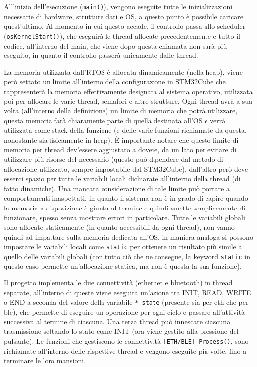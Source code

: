 All'inizio dell'esecuzione (\texttt{main()}), vengono eseguite tutte le inizializzazioni necessarie di hardware, strutture dati e OS, a questo punto \`e possibile caricare quest'ultimo. Al momento in cui questo accade, il controllo passa allo scheduler (\texttt{osKernelStart()}), che eseguir\`a le thread allocate precedentemente e tutto il codice, all'interno del main, che viene dopo questa chiamata non sar\`a pi\`u eseguito, in quanto il controllo passer\`a unicamente dalle thread.

La memoria utilizzata dall'RTOS \`e allocata dinamicamente (nella heap), viene per\`o settato un limite all'interno della configurazione in STM32Cube che rappresenter\`a la memoria effettivamente designata al sistema operativo, utilizzata poi per allocare le varie thread, semafori e altre strutture. Ogni thread avr\`a a sua volta (all'interno della definizione) un limite di memoria che potr\`a utilizzare, questa memoria far\`a chiaramente parte di quella destinata all'OS e verr\`a utilizzata come stack della funzione (e delle varie funzioni richiamate da questa, nonostante sia fisicamente in heap). \`E importante notare che questo limite di memoria per thread dev'essere aggiustato a dovere, da un lato per evitare di utilizzare pi\`u risorse del necessario (questo pu\`o dipendere dal metodo di allocazione utilizzato, sempre impostabile dal STM32Cube), dall'altro per\`o deve esserci spazio per tutte le variabili locali dichiarate all'interno della thread (di fatto dinamiche). Una mancata considerazione di tale limite pu\`o portare a comportamenti inaspettati, in quanto il sistema non \`e in grado di capire quando la memoria a disposizione \`e giunta al termine e quindi smette semplicemente di funzionare, spesso senza mostrare errori in particolare. Tutte le variabili globali sono allocate staticamente (in quanto accessibili da ogni thread), non vanno quindi ad impattare sulla memoria dedicata all'OS, in maniera analoga si possono impostare le variabili locali come \texttt{static} per ottenere un risultato pi\`u simile a quello delle variabili globali (con tutto ci\`o che ne consegue, la keyword \texttt{static} in questo caso permette un'allocazione statica, ma non \`e questa la sua funzione).

Il progetto implementa le due connettivit\`a (ethernet e bluetooth) in thread separate, all'interno di queste viene eseguita un'azione tra INIT, READ, WRITE o END a seconda del valore della variabile \texttt{*\_state} (presente sia per eth che per ble), che permette di eseguire un operazione per ogni ciclo e passare all'attivit\`a successiva al termine di ciascuna. Una terza thread pu\`o innescare ciascuna trasmissione settando lo stato come INIT (ora viene gestito alla pressione del pulsante). Le funzioni che gestiscono le connettivit\`a \texttt{[ETH/BLE]\_Process()}, sono richiamate all'interno delle rispettive thread e vengono eseguite pi\`u volte, fino a terminare le loro mansioni.


